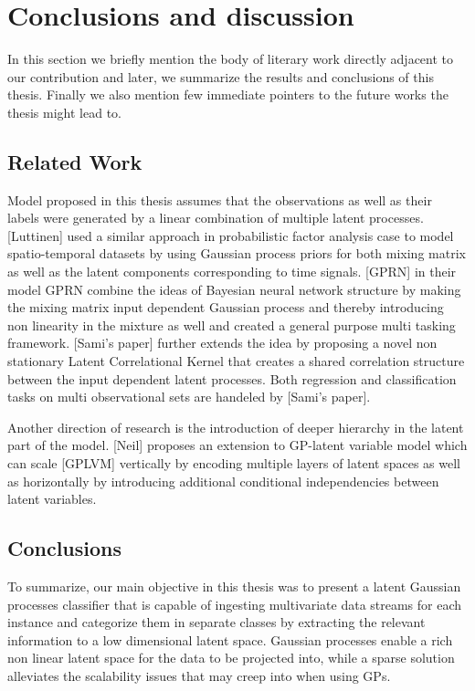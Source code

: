 \section{Conclusions and discussion}
In this section we briefly mention the body of literary work directly adjacent to our contribution and later, we summarize the results and conclusions of this thesis. Finally we also mention few immediate pointers to the future works the thesis might lead to.

\subsection{Related Work}
Model proposed in this thesis assumes that the observations as well as their labels were generated by a linear combination of multiple latent processes. [Luttinen] used a similar approach in probabilistic factor analysis case to model spatio-temporal datasets by using Gaussian process priors for both mixing matrix as well as the latent components corresponding to time signals.  [GPRN] in their model GPRN combine the ideas of Bayesian neural network structure by making the mixing matrix input dependent Gaussian process and thereby introducing non linearity in the mixture as well and created a general purpose multi tasking framework. [Sami’s paper] further extends the idea by proposing a novel non stationary Latent Correlational Kernel that creates a shared correlation structure between the input dependent latent processes. Both regression and classification tasks on multi observational sets are handeled by [Sami’s paper]. 

Another direction of research is the introduction of deeper hierarchy in the latent part of the model. [Neil] proposes an extension to GP-latent variable model which can scale [GPLVM] vertically by encoding multiple layers of latent spaces as well as horizontally by introducing additional conditional independencies between latent variables. 

\subsection{Conclusions}
To summarize, our main objective in this thesis was to present a latent Gaussian processes classifier that is capable of ingesting multivariate data streams for each instance and categorize them in separate classes by extracting the relevant information to a low dimensional latent space. Gaussian processes enable a rich non linear latent space for the data to be projected into, while a sparse solution alleviates the scalability issues that may creep into when using GPs.

